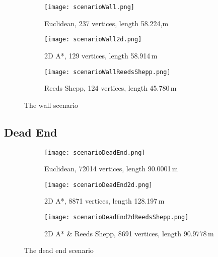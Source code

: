 \begin{figure}[h]
    \centering
    \begin{subfigure}[t]{\textwidth}
        \texttt{[image: scenarioWall.png]}
        \caption{Euclidean, 237 vertices, length 58.224,m}
        \label{fig:scenarioWall}
    \end{subfigure}
    \begin{subfigure}[t]{\textwidth}
        \texttt{[image: scenarioWall2d.png]}
        \caption{2D A*, 129 vertices, length 58.914\,m}
        \label{fig:scenarioWall2d}
    \end{subfigure}    
    \begin{subfigure}[t]{\textwidth}
        \texttt{[image: scenarioWallReedsShepp.png]}
        \caption{Reeds Shepp, 124 vertices, length 45.780\,m}
        \label{fig:scenarioWallReedsShepp}
    \end{subfigure}
    \caption{The wall scenario}
    \label{fig:scenarioWall}
\end{figure}

\subsection{Dead End}

\begin{figure}[h]
    \centering
    \begin{subfigure}[t]{\textwidth}
        \texttt{[image: scenarioDeadEnd.png]}
        \caption{Euclidean, 72014 vertices, length 90.0001\,m}
        \label{fig:scenarioDeadEnd}
    \end{subfigure}
    \begin{subfigure}[t]{\textwidth}
        \texttt{[image: scenarioDeadEnd2d.png]}
        \caption{2D A*, 8871 vertices, length 128.197\,m}
        \label{fig:scenarioDeadEnd2d}
    \end{subfigure}    
    \begin{subfigure}[t]{\textwidth}
        \texttt{[image: scenarioDeadEnd2dReedsShepp.png]}
        \caption{2D A* \& Reeds Shepp, 8691 vertices, length 90.9778\,m}
        \label{fig:scenarioDeadEnd2dReedsShepp}
    \end{subfigure}
    \caption{The dead end scenario}
    \label{fig:scenarioDeadEnd}
\end{figure}


